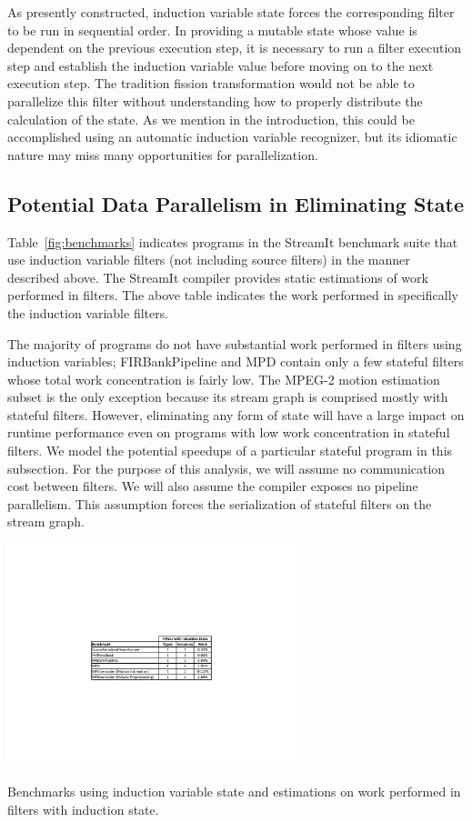 As presently constructed, induction variable state for\-ces the
corresponding filter to be run in sequential order.  In providing a
mutable state whose value is dependent on the previous execution step,
it is necessary to run a filter execution step and establish the
induction variable value before moving on to the next execution step.
The tradition fission transformation would not be able to parallelize
this filter without understanding how to properly distribute the
calculation of the state.  As we mention in the introduction, this
could be accomplished using an automatic induction variable
recognizer, but its idiomatic nature may miss many opportunities for
parallelization.  

\subsection{Potential Data Parallelism in Eliminating State}
Table~\ref{fig:benchmarks} indicates programs in the StreamIt benchmark suite that use induction variable filters (not including source filters) in the manner described above.  The StreamIt compiler provides static estimations of work performed in filters.  The above table indicates the work performed in specifically the induction variable filters.

The majority of programs do not have substantial work performed in filters using induction variables; FIRBankPipeline and MPD contain only a few stateful filters whose total work concentration is fairly low.  The MPEG-2 motion estimation subset is the only exception because its stream graph is comprised mostly with stateful filters.  However, eliminating any form of state will have a large impact on runtime performance even on programs with low work concentration in stateful filters.  We model the potential speedups of a particular stateful program in this subsection.  For the purpose of this analysis, we will assume no communication cost between filters.  We will also assume the compiler exposes no pipeline parallelism.  This assumption forces the serialization of stateful filters on the stream graph.

\begin{table}[t]
\includegraphics[width=3.3in]{figures/induction-benchmarks.pdf}
\caption{Benchmarks using induction variable state and estimations on work performed in filters with induction state.\protect\label{fig:benchmarks}}
\end{table}

